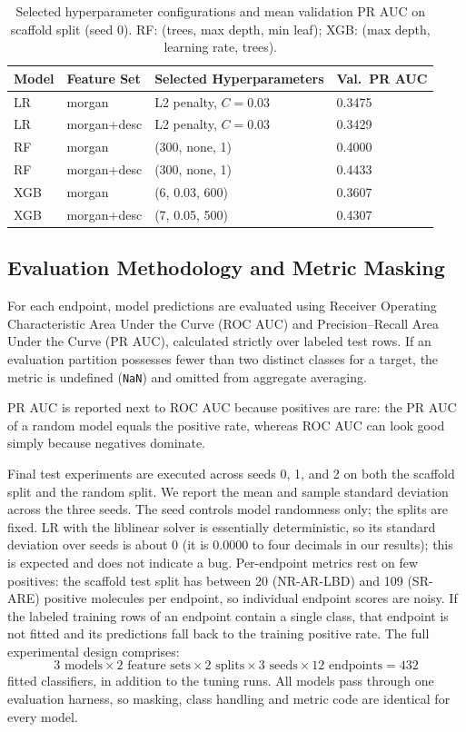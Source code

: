 \begin{table}[t]
\caption{Selected hyperparameter configurations and mean validation PR AUC on scaffold split (seed 0). RF: (trees, max depth, min leaf); XGB: (max depth, learning rate, trees).}
\label{tab:chosen}
\centering\small
\setlength{\tabcolsep}{4pt}
\begin{tabular}{@{}llll@{}}
\toprule
Model & Feature Set & Selected Hyperparameters & Val.\ PR AUC \\
\midrule
LR  & morgan      & L2 penalty, $C=0.03$       & 0.3475 \\
LR  & morgan+desc & L2 penalty, $C=0.03$       & 0.3429 \\
RF  & morgan      & (300, none, 1)             & 0.4000 \\
RF  & morgan+desc & (300, none, 1)             & 0.4433 \\
XGB & morgan      & (6, 0.03, 600)             & 0.3607 \\
XGB & morgan+desc & (7, 0.05, 500)             & 0.4307 \\
\bottomrule
\end{tabular}
\end{table}

\subsection{Evaluation Methodology and Metric Masking}
For each endpoint, model predictions are evaluated using Receiver Operating Characteristic Area Under the Curve (ROC AUC) and Precision--Recall Area Under the Curve (PR AUC), calculated strictly over labeled test rows. If an evaluation partition possesses fewer than two distinct classes for a target, the metric is undefined (\texttt{NaN}) and omitted from aggregate averaging.

PR AUC is reported next to ROC AUC because positives are rare: the PR AUC of a random model equals the positive rate, whereas ROC AUC can look good simply because negatives dominate.

Final test experiments are executed across seeds 0, 1, and 2 on both the scaffold split and the random split. We report the mean and sample standard deviation across the three seeds. The seed controls model randomness only; the splits are fixed. LR with the liblinear solver is essentially deterministic, so its standard deviation over seeds is about $0$ (it is $0.0000$ to four decimals in our results); this is expected and does not indicate a bug. Per-endpoint metrics rest on few positives: the scaffold test split has between 20 (NR-AR-LBD) and 109 (SR-ARE) positive molecules per endpoint, so individual endpoint scores are noisy. If the labeled training rows of an endpoint contain a single class, that endpoint is not fitted and its predictions fall back to the training positive rate. The full experimental design comprises:
\begin{equation*}
    3\text{ models} \times 2\text{ feature sets} \times 2\text{ splits} \times 3\text{ seeds} \times 12\text{ endpoints} = 432
\end{equation*}
fitted classifiers, in addition to the tuning runs. All models pass through one evaluation harness, so masking, class handling and metric code are identical for every model.
